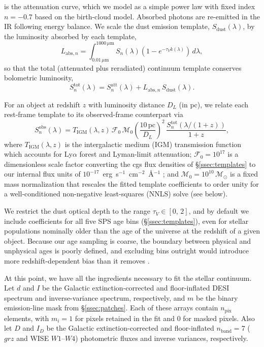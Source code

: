 \documentclass[modern,linenumbers]{aastex702}
\newcommand{\tauv}{\ensuremath{\tau_V}}
\newcommand{\msun}{\ensuremath{\mathcal{M}_{\odot}}}
\begin{document}
\noindent is the attenuation curve, which we model as a simple power
law with fixed index $n=-0.7$ based on the \citet{charlot00a}
birth-cloud model.  Absorbed photons are re-emitted in the IR
following energy balance. We scale the \citet{draine07a} dust emission
template, $S_\mathrm{dust}(\lambda)$, by the luminosity absorbed by
each template,
\begin{equation}
  L_{\mathrm{abs},n} =
  \int_{0.01\,\mu\mathrm{m}}^{1000\,\mu\mathrm{m}} S_n(\lambda) (1 -
  e^{-\tauv k(\lambda)})\,d\lambda,
  \label{eq:labs}
\end{equation}
so that the total (attenuated plus reradiated) continuum template
conserves bolometric luminosity,
\begin{equation}
  S_n^\mathrm{tot}(\lambda) = S_n^\mathrm{att}(\lambda) +
  L_{\mathrm{abs},n}\,S_\mathrm{dust}(\lambda).
  \label{eq:ftot}
\end{equation}

For an object at redshift $z$ with luminosity distance $D_L$ (in pc),
we relate each rest-frame template to its observed-frame counterpart
via
\begin{equation}
  S_n^\mathrm{obs}(\lambda)
  =
  T_\mathrm{IGM}(\lambda,z)\,
  \mathcal{F}_0\,\mathcal{M}_0
  \left(\frac{10\,\mathrm{pc}}{D_L}\right)^{2}
  \,\frac{S_n^\mathrm{tot}(\lambda/(1+z))}{1+z},
  \label{eq:zfactor}
\end{equation}
where $T_\mathrm{IGM}(\lambda,z)$ is the \citet{inoue14a}
intergalactic medium (IGM) transmission function which accounts for
Ly$\alpha$ forest and Lyman-limit attenuation; $\mathcal{F}_0 =
10^{17}$ is a dimensionless scale factor converting the cgs flux
densities of \S\ref{ssec:templates} to our internal flux units of
$10^{-17}$~erg~s$^{-1}$~cm$^{-2}$~\AA$^{-1}$ \citep{guy23a}; and
$\mathcal{M}_0 = 10^{10}\,\msun$ is a fixed mass normalization that
rescales the fitted template coefficients to order unity for a
well-conditioned non-negative least-squares (NNLS) solve (see below).

We restrict the dust optical depth to the range
$\tauv \in [0,\,2]$, and by default we include coefficients for all
five SPS age bins (\S\ref{ssec:templates}), even for stellar
populations nominally older than the age of the universe at the
redshift of a given object. Because our age sampling is coarse, the
boundary between physical and unphysical ages is poorly defined, and
excluding bins outright would introduce more redshift-dependent bias
than it removes \citep{leja19a}.

At this point, we have all the ingredients necessary to fit the
stellar continuum. Let $d$ and $I$ be the Galactic
extinction-corrected and floor-inflated DESI spectrum and
inverse-variance spectrum, respectively, and $m$ be the binary
emission-line mask from \S\ref{ssec:patches}. Each of these arrays
contain $n_\mathrm{pix}$ elements, with $m_i=1$ for pixels retained in
the fit and $0$ for masked pixels. Also let $D$ and $I_D$ be the
Galactic extinction-corrected and floor-inflated $n_\mathrm{band}=7$
($grz$ and WISE $W1$--$W4$) photometric fluxes and inverse variances,
respectively.
\end{document}
